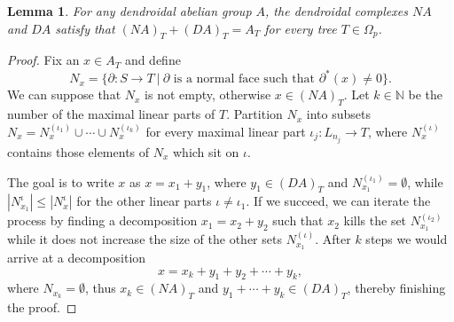 \documentclass[a4paper]{amsart}
\newcommand{\N}{{\mathbb N}}
\theoremstyle{plain}
\newtheorem{lem}[thm]{Lemma}
\theoremstyle{definition}
\theoremstyle{remark}
\newcommand{\rpd}{\Omega_p}
\newcommand{\To}{\longrightarrow}
\numberwithin{equation}{section}
\numberwithin{figure}{section}
\begin{document}
\begin{lem}\label{direct sum 2}
For any dendroidal abelian group $A$, the dendroidal complexes $NA$ and $DA$ satisfy that $(NA)_T+(DA)_T=A_T$ for every tree $T\in\rpd$.
\end{lem}
\begin{proof}
Fix an $x\in A_T$ and define
\[
N_x=\big\{\partial\colon S\To T\ \big|\ \partial \mbox{ is a normal face such that } \partial^*(x)\neq 0\big\}.
\]
We can suppose that $N_x$ is not empty, otherwise $x\in (NA)_T$. Let $k\in \N$ be the number of the maximal linear parts of $T$. Partition $N_x$ into subsets $N_x=N_x^{(\iota_1)}\cup\cdots\cup N_x^{(\iota_k)}$ for every maximal linear part $\iota_j\colon L_{n_j}\To T$, where $N_x^{(\iota)}$ contains those elements of $N_x$ which sit on $\iota$.

The goal is to write $x$ as $x=x_1+y_1$, where $y_1\in (DA)_T$ and $N_{x_1}^{(\iota_1)}=\emptyset$, while $|N_{x_1}^\iota|\leq |N_x^\iota|$ for the other linear parts $\iota\ne \iota_1$. If we succeed, we can iterate the process by finding a decomposition $x_1=x_2+y_2$ such that $x_2$ kills the set $N_{x_1}^{(\iota_2)}$ while it does not increase the size of the other sets $N_{x_1}^{(\iota)}$.
After $k$ steps we would arrive at a decomposition
\[
x=x_k+y_1+y_2+\cdots+y_k,
\]
where $N_{x_k}=\emptyset$, thus $x_k\in (NA)_T$ and $y_1+\cdots+y_k\in (DA)_T$, thereby finishing the proof.


\end{proof}
\end{document}
